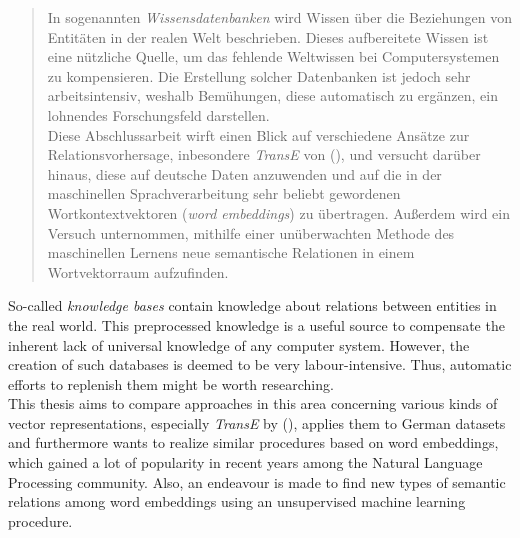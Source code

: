 \documentclass[
captions=nooneline,
11pt, %
ngerman, %
singlespacing, %
headsepline, %
]{MastersDoctoralThesis} %
\begin{document}
\begin{abstract}
\addchaptertocentry{\abstractname} %

In sogenannten \emph{Wissensdatenbanken} wird Wissen über die Beziehungen von Entitäten in der realen Welt
beschrieben. Dieses aufbereitete Wissen ist eine nützliche Quelle, um das fehlende Weltwissen
bei Computersystemen zu kompensieren. Die Erstellung solcher Datenbanken ist jedoch sehr
arbeitsintensiv, weshalb Bemühungen, diese automatisch zu ergänzen, ein lohnendes Forschungsfeld darstellen.\\
Diese Abschlussarbeit wirft einen Blick auf verschiedene Ansätze zur Relationsvorhersage, inbesondere \emph{TransE}
von (\cite{bordes2013translating}), und versucht darüber hinaus, diese auf deutsche Daten anzuwenden und auf
die in der maschinellen Sprachverarbeitung sehr beliebt gewordenen Wortkontextvektoren
(\emph{word embeddings}) zu übertragen. Außerdem wird ein Versuch unternommen, mithilfe einer
unüberwachten Methode des maschinellen Lernens neue semantische Relationen in einem Wortvektorraum
aufzufinden.

\end{abstract}


\begin{abstracteng}

So-called \emph{knowledge bases} contain knowledge about relations between entities in
the real world. This preprocessed knowledge is a useful source to compensate the inherent lack of universal knowledge
of any computer system. However, the creation of such databases is deemed to be very labour-intensive.
Thus, automatic efforts to replenish them might be worth researching.\\
This thesis aims to compare approaches in this area concerning various kinds of
vector representations, especially \emph{TransE} by (\cite{bordes2013translating}),
 applies them to German datasets and furthermore wants to realize similar procedures based on word embeddings,
which gained a lot of popularity in recent years among the Natural Language Processing community.
Also, an endeavour is made to find new types of semantic relations among word embeddings using
an unsupervised machine learning procedure.

\end{abstracteng}
\end{document}
